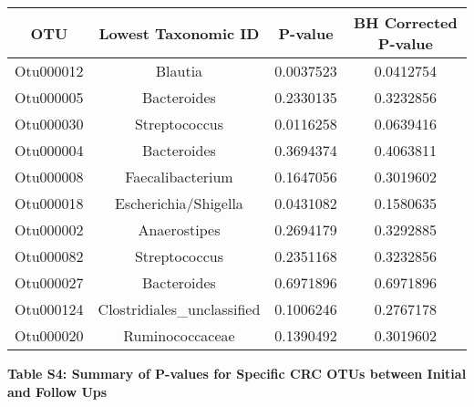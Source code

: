 \documentclass[12pt,]{article}
\begin{document}
\begin{longtable}[]{@{}cccc@{}}
\toprule
OTU & Lowest Taxonomic ID & P-value & BH Corrected
P-value\tabularnewline
\midrule
\endhead
Otu000012 & Blautia & 0.0037523 & 0.0412754\tabularnewline
Otu000005 & Bacteroides & 0.2330135 & 0.3232856\tabularnewline
Otu000030 & Streptococcus & 0.0116258 & 0.0639416\tabularnewline
Otu000004 & Bacteroides & 0.3694374 & 0.4063811\tabularnewline
Otu000008 & Faecalibacterium & 0.1647056 & 0.3019602\tabularnewline
Otu000018 & Escherichia/Shigella & 0.0431082 & 0.1580635\tabularnewline
Otu000002 & Anaerostipes & 0.2694179 & 0.3292885\tabularnewline
Otu000082 & Streptococcus & 0.2351168 & 0.3232856\tabularnewline
Otu000027 & Bacteroides & 0.6971896 & 0.6971896\tabularnewline
Otu000124 & Clostridiales\_unclassified & 0.1006246 &
0.2767178\tabularnewline
Otu000020 & Ruminococcaceae & 0.1390492 & 0.3019602\tabularnewline
\bottomrule
\end{longtable}

\newpage

\textbf{Table S4: Summary of P-values for Specific CRC OTUs between
Initial and Follow Ups}
\end{document}
